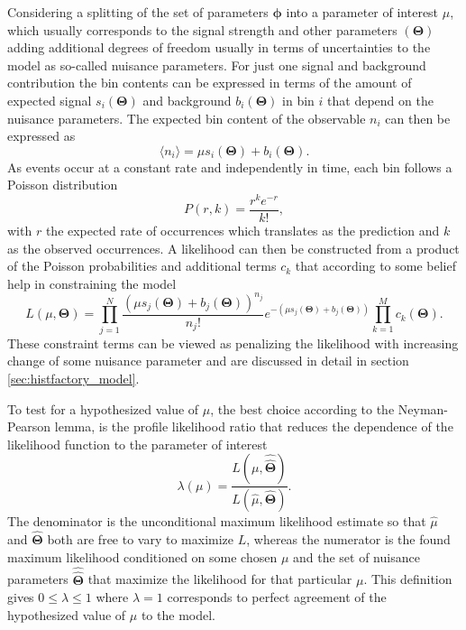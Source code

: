Considering a splitting of the set of parameters $\bm{\phi}$ into a parameter of interest $\mu$, which usually corresponds to the signal strength and other parameters $(\bm{\Theta})$ adding additional degrees of freedom usually in terms of uncertainties to the model as so-called nuisance parameters. For just one signal and background contribution the bin contents can be expressed in terms of the amount of expected signal $s_i(\bm{\Theta})$ and background $b_i(\bm{\Theta})$ in bin $i$ that depend on the nuisance parameters. The expected bin content of the observable $n_i$ can then be expressed as
\begin{equation} \label{eq:n_i}
    \langle n_i\rangle = \mu s_i(\bm{\Theta}) +b_i(\bm{\Theta}).
\end{equation}
As events occur at a constant rate and independently in time, each bin follows a Poisson distribution
\begin{equation}\label{eq:poisson}
    P(r,k)=\frac{r^k e^{-r}}{k!},
\end{equation}
with $r$ the expected rate of occurrences which translates as the prediction and $k$ as the observed occurrences. A likelihood can then be constructed from a product of the Poisson probabilities and additional terms $c_k$ that according to some belief help in constraining the model
\begin{equation}\label{eq:likelihood}
    L(\mu,\bm{\Theta})=
    \prod_{j=1}^N \frac{(\mu s_j(\bm{\Theta}) + b_j(\bm{\Theta}))^{n_j}}{n_j !} e^{-(\mu s_j(\bm{\Theta}) + b_j(\bm{\Theta}))}
    \prod_{k=1}^M c_k(\bm{\Theta}).
\end{equation}
These constraint terms can be viewed as penalizing the likelihood with increasing change of some nuisance parameter and are discussed in detail in section \ref{sec:histfactory_model}. 

To test for a hypothesized value of $\mu$, the best choice according to the Neyman-Pearson lemma, is the profile likelihood ratio that reduces the dependence of the likelihood function to the parameter of interest
\begin{equation}\label{eq:likelihood_ratio}
    \lambda(\mu)=
    \frac{L(\mu,\hat{\hat{\bm{\Theta}}})}
    {L(\hat{\mu},\hat{\bm{\Theta}})}.
\end{equation}
The denominator is the unconditional maximum likelihood estimate so that $\hat{\mu}$ and $\hat{\bm{\Theta}}$ both are free to vary to maximize $L$, whereas the numerator is the found maximum likelihood conditioned on some chosen $\mu$ and the set of nuisance parameters $\hat{\hat{\bm{\Theta}}}$ that maximize the likelihood for that particular $\mu$. This definition gives $0 \leq \lambda \leq 1$ where $\lambda = 1$ corresponds to perfect agreement of the hypothesized value of $\mu$ to the model.

